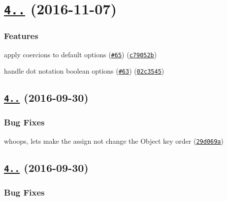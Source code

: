 \label{_4.1.0}%
 \section*{\href{https://github.com/yargs/yargs-parser/compare/v4.0.2...v4.1.0}{\tt 4..} (2016-\/11-\/07)}

\subsubsection*{Features}


\begin{DoxyItemize}
\item apply coercions to default options (\href{https://github.com/yargs/yargs-parser/issues/65}{\tt \#65}) (\href{https://github.com/yargs/yargs-parser/commit/c79052b}{\tt c79052b})
\item handle dot notation boolean options (\href{https://github.com/yargs/yargs-parser/issues/63}{\tt \#63}) (\href{https://github.com/yargs/yargs-parser/commit/02c3545}{\tt 02c3545})
\end{DoxyItemize}

\label{_4.0.2}%
 \subsection*{\href{https://github.com/yargs/yargs-parser/compare/v4.0.1...v4.0.2}{\tt 4..} (2016-\/09-\/30)}

\subsubsection*{Bug Fixes}


\begin{DoxyItemize}
\item whoops, let\textquotesingle{}s make the assign not change the Object key order (\href{https://github.com/yargs/yargs-parser/commit/29d069a}{\tt 29d069a})
\end{DoxyItemize}

\label{_4.0.1}%
 \subsection*{\href{https://github.com/yargs/yargs-parser/compare/v4.0.0...v4.0.1}{\tt 4..} (2016-\/09-\/30)}

\subsubsection*{Bug Fixes}


